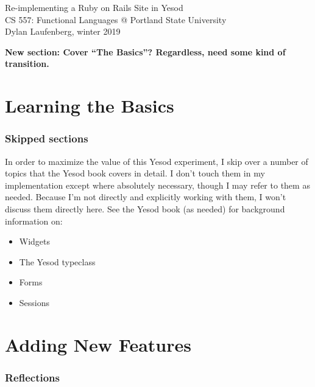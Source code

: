 \documentclass{article}
\newcommand {\todo}[1] {{\textbf{\color{red}#1}}}
\begin{document}
\begin{center}
    \Huge Re-implementing a Ruby on Rails Site in Yesod \\
    \large CS 557: Functional Languages @ Portland State University \\
    Dylan Laufenberg, winter 2019
\end{center}



\todo{New section: Cover ``The Basics''? Regardless, need some kind of transition.}

\part{Learning the Basics}





\section{Skipped sections}

In order to maximize the value of this Yesod experiment, I skip over a number of topics that the Yesod book covers in detail. I don't touch them in my implementation except where absolutely necessary, though I may refer to them as needed. Because I'm not directly and explicitly working with them, I won't discuss them directly here. See the Yesod book (as needed) for background information on:

\begin{itemize}
  \item Widgets
  \item The Yesod typeclass
  \item Forms
  \item Sessions
\end{itemize}

\part{Adding New Features}



% 
% 

\section{Reflections}
\end{document}
